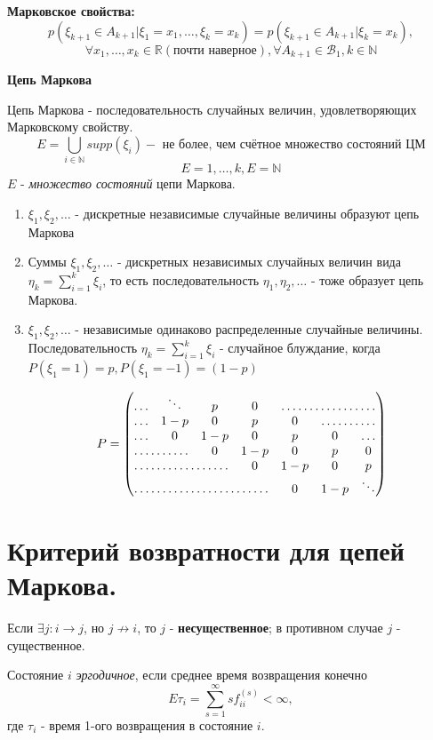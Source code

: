 \noindent\textbf{Марковское свойства:}
\[ p(\xi_{k+1} \in A_{k+1} | \xi_1 = x_1, \dots, \xi_k = x_k) = p (\xi_{k+1} \in A_{k+1} | \xi_k = x_k),\]
\[\forall x_1, \dots, x_k \in \mathbb{R} (\text{почти наверное}), \forall A_{k+1} \in \mathcal{B}_1, k \in \mathbb{N} \]

\noindent \textbf{Цепь Маркова}

Цепь Маркова - последовательность случайных величин, удовлетворяющих Марковскому свойству.
\[ E = \bigcup_{i \in \mathbb{N}} supp(\xi_i) - \text{ не более, чем счётное множество состояний ЦМ} \]
\[E={1,\dots,k}, E=\mathbb{N}\]
$E$ - \textit{множество состояний} цепи Маркова.

\begin{enumerate}
	\item $\xi_1, \xi_2, \dots$ - дискретные независимые случайные величины образуют цепь Маркова
	\item Суммы $\xi_1, \xi_2, \dots$ - дискретных независимых случайных величин вида $\eta_k = \sum\limits_{i=1}^k \xi_i$, то есть последовательность $\eta_1, \eta_2, \dots$ - тоже образует цепь Маркова.
	\item $\xi_1, \xi_2, \dots$ - независимые одинаково распределенные случайные величины. Последовательность $\eta_k = \sum\limits_{i=1}^k \xi_i$ - случайное блуждание, когда $P(\xi_1 =1)=p, P(\xi_1=-1)=(1-p)$

	\[
	P = 
	\begin{pmatrix}
		\ldots       & \ddots & p   & 0 & \hdotsfor{3} \\
		\ldots       & 1-p    & 0   & p & 0 & \hdotsfor{2} \\
		\ldots       & 0      & 1-p & 0 & p & 0 & \ldots \\
		\hdotsfor{2} & 0      & 1-p & 0 & p & 0 \\
		\hdotsfor{3} & 0      & 1-p & 0 & p \\
		\hdotsfor{4} & 0      & 1-p & \ddots
	\end{pmatrix}
	\]
\end{enumerate}

\section{Критерий возвратности для цепей Маркова.}

\noindent Если $\exists j: i \to j$, но $j \not\to i$, то $j$ - \textbf{несущественное}; в противном случае $j$ - существенное.

\noindent Состояние $i$ \textit{эргодичное}, если среднее время возвращения конечно
\[ E \tau_i = \sum_{s=1}^{\infty} s f_{ii}^{(s)} < \infty, \]
где $\tau_i$ - время 1-ого возвращения в состояние $i$.

